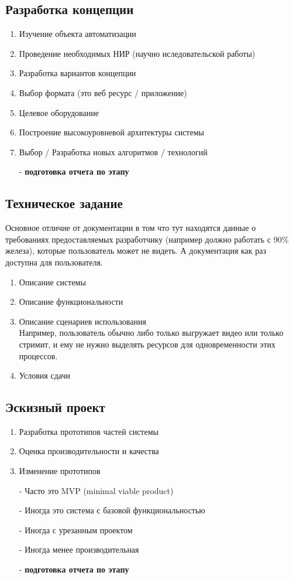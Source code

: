 \documentclass[12pt; a4paper]{article}
\begin{document}
\subsection{Разработка концепции}
\begin{enumerate}
\item Изучение объекта автоматизации
\item Проведение необходимых НИР (научно иследовательской работы)
\item Разработка вариантов концепции
\item Выбор формата (это веб ресурс / приложение)
\item Целевое оборудование
\item Построение высокоуровневой архитектуры системы
\item Выбор / Разработка новых алгоритмов / технологий
\item[-] \textbf{подготовка отчета по этапу}
\end{enumerate}

\subsection{Техническое задание}
Основное отличие от документации в том что тут находятся данные о требованиях
предоставляемых разработчику (например должно работать с 90\% железа), которые пользователь может не видеть. А документация как раз доступна для пользователя.
\begin{enumerate}
\item Описание системы
\item Описание функциональности
\item \hangindent=6cm  \noindent Описание сценариев использования\\ {\footnotesize Например, пользователь обычно либо только выгружает видео или только стримит, и ему не нужно выделять ресурсов для одновременности этих процессов.}
\item Условия сдачи
\end{enumerate}

\subsection{Эскизный проект}
\begin{enumerate}
\item Разработка прототипов частей системы
\item Оценка производительности и качества
\item Изменение прототипов
\item[-] Часто это MVP (minimal viable product)
\item[-] Иногда это система с базовой функциональностью
\item[-] Иногда с урезанным проектом
\item[-] Иногда менее производительная
\item[-] \textbf{подготовка отчета по этапу}
\end{enumerate}
\end{document}
